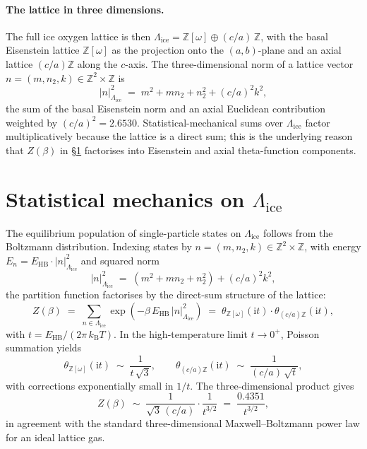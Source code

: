 \documentclass[final]{siamltex}
\newcommand{\EHB}{E_{\mathrm{HB}}}
\newcommand{\kB}{k_{\mathrm{B}}}
\newcommand{\Z}{\mathbb{Z}}
\newcommand{\Eisenstein}{\mathbb{Z}[\omega]}
\newcommand{\IceLat}{\Lambda_{\mathrm{ice}}}
\begin{document}
\paragraph{The lattice in three dimensions.}  The full ice oxygen
lattice is then $\IceLat = \Eisenstein \oplus (c/a)\,\Z$, with the
basal Eisenstein lattice $\Eisenstein$ as the projection onto the
$(a, b)$-plane and an axial lattice $(c/a)\Z$ along the $c$-axis.
The three-dimensional norm of a lattice vector $n = (m, n_2, k)
\in \Z^2 \times \Z$ is
\begin{equation}\label{eq:norm-3d}
|n|^2_{\IceLat} \;=\; m^2 + m n_2 + n_2^2 + (c/a)^2 k^2,
\end{equation}
the sum of the basal Eisenstein norm and an axial Euclidean
contribution weighted by $(c/a)^2 = 2.6530$.  Statistical-mechanical
sums over $\IceLat$ factor multiplicatively because the lattice is
a direct sum; this is the underlying reason that
$Z(\beta)$ in \S\ref{sec:statmech} factorises into Eisenstein and
axial theta-function components.

\section{Statistical mechanics on $\IceLat$}
\label{sec:statmech}

The equilibrium population of single-particle states on $\IceLat$
follows from the Boltzmann distribution.  Indexing states by
$n = (m, n_2, k) \in \Z^2 \times \Z$, with energy
$E_n = \EHB \cdot |n|^2_{\IceLat}$ and squared norm
\begin{equation}
|n|^2_{\IceLat} \;=\; (m^2 + m n_2 + n_2^2) + (c/a)^2 k^2,
\end{equation}
the partition function factorises by the direct-sum structure
of the lattice:
\begin{equation}\label{eq:Z}
Z(\beta) \;=\; \sum_{n \in \IceLat} \exp(-\beta\,\EHB\,|n|^2_{\IceLat})
        \;=\; \theta_{\Eisenstein}(\mathrm{i} t) \cdot \theta_{(c/a)\Z}(\mathrm{i} t),
\end{equation}
with $t = \EHB/(2\pi\,\kB T)$.  In the high-temperature limit
$t \to 0^+$, Poisson summation yields
\begin{equation}\label{eq:asymp}
\theta_{\Eisenstein}(\mathrm{i} t) \;\sim\; \frac{1}{t\,\sqrt{3}},
\qquad
\theta_{(c/a)\Z}(\mathrm{i} t) \;\sim\; \frac{1}{(c/a)\,\sqrt{t}},
\end{equation}
with corrections exponentially small in $1/t$.  The
three-dimensional product gives
\begin{equation}\label{eq:Z3D}
Z(\beta) \;\sim\; \frac{1}{\sqrt{3}\,(c/a)} \cdot \frac{1}{t^{3/2}}
        \;=\; \frac{0.4351}{t^{3/2}},
\end{equation}
in agreement with the standard three-dimensional Maxwell--Boltzmann
power law for an ideal lattice gas.
\end{document}
